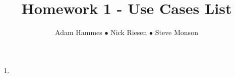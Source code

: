 \documentclass{article}
\title{Homework 1 - Use Cases List}
\author{Adam Hammes $\bullet$ Nick Riesen $\bullet$ Steve Monson}
\begin{document}
\maketitle

\begin{enumerate}
    \item
\end{enumerate}
\end{document}

